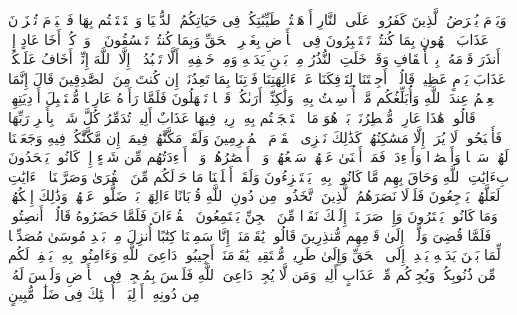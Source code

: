 \startbuffer[\q:46:20]
وَیَوۡمَ یُعۡرَضُ ٱلَّذِینَ كَفَرُوا۟ عَلَى ٱلنَّارِ أَذۡهَبۡتُمۡ طَیِّبَٰتِكُمۡ فِی حَیَاتِكُمُ ٱلدُّنۡیَا وَٱسۡتَمۡتَعۡتُم بِهَا فَٱلۡیَوۡمَ تُجۡزَوۡنَ عَذَابَ ٱلۡهُونِ بِمَا كُنتُمۡ تَسۡتَكۡبِرُونَ فِی ٱلۡأَرۡضِ بِغَیۡرِ ٱلۡحَقِّ وَبِمَا كُنتُمۡ تَفۡسُقُونَ%
\stopbuffer%
\startbuffer[\q:46:21]
۞ وَٱذۡكُرۡ أَخَا عَادٍ إِذۡ أَنذَرَ قَوۡمَهُۥ بِٱلۡأَحۡقَافِ وَقَدۡ خَلَتِ ٱلنُّذُرُ مِنۢ بَیۡنِ یَدَیۡهِ وَمِنۡ خَلۡفِهِۦۤ أَلَّا تَعۡبُدُوۤا۟ إِلَّا ٱللَّهَ إِنِّیۤ أَخَافُ عَلَیۡكُمۡ عَذَابَ یَوۡمٍ عَظِیمࣲ%
\stopbuffer%
\startbuffer[\q:46:22]
قَالُوۤا۟ أَجِئۡتَنَا لِتَأۡفِكَنَا عَنۡ ءَالِهَتِنَا فَأۡتِنَا بِمَا تَعِدُنَاۤ إِن كُنتَ مِنَ ٱلصَّٰدِقِینَ%
\stopbuffer%
\startbuffer[\q:46:23]
قَالَ إِنَّمَا ٱلۡعِلۡمُ عِندَ ٱللَّهِ وَأُبَلِّغُكُم مَّاۤ أُرۡسِلۡتُ بِهِۦ وَلَٰكِنِّیۤ أَرَىٰكُمۡ قَوۡمࣰا تَجۡهَلُونَ%
\stopbuffer%
\startbuffer[\q:46:24]
فَلَمَّا رَأَوۡهُ عَارِضࣰا مُّسۡتَقۡبِلَ أَوۡدِیَتِهِمۡ قَالُوا۟ هَٰذَا عَارِضࣱ مُّمۡطِرُنَاۚ بَلۡ هُوَ مَا ٱسۡتَعۡجَلۡتُم بِهِۦۖ رِیحࣱ فِیهَا عَذَابٌ أَلِیمࣱ%
\stopbuffer%
\startbuffer[\q:46:25]
تُدَمِّرُ كُلَّ شَیۡءِۭ بِأَمۡرِ رَبِّهَا فَأَصۡبَحُوا۟ لَا یُرَىٰۤ إِلَّا مَسَٰكِنُهُمۡۚ كَذَٰلِكَ نَجۡزِی ٱلۡقَوۡمَ ٱلۡمُجۡرِمِینَ%
\stopbuffer%
\startbuffer[\q:46:26]
وَلَقَدۡ مَكَّنَّٰهُمۡ فِیمَاۤ إِن مَّكَّنَّٰكُمۡ فِیهِ وَجَعَلۡنَا لَهُمۡ سَمۡعࣰا وَأَبۡصَٰرࣰا وَأَفۡءِدَةࣰ فَمَاۤ أَغۡنَىٰ عَنۡهُمۡ سَمۡعُهُمۡ وَلَاۤ أَبۡصَٰرُهُمۡ وَلَاۤ أَفۡءِدَتُهُم مِّن شَیۡءٍ إِذۡ كَانُوا۟ یَجۡحَدُونَ بِءَایَٰتِ ٱللَّهِ وَحَاقَ بِهِم مَّا كَانُوا۟ بِهِۦ یَسۡتَهۡزِءُونَ%
\stopbuffer%
\startbuffer[\q:46:27]
وَلَقَدۡ أَهۡلَكۡنَا مَا حَوۡلَكُم مِّنَ ٱلۡقُرَىٰ وَصَرَّفۡنَا ٱلۡءَایَٰتِ لَعَلَّهُمۡ یَرۡجِعُونَ%
\stopbuffer%
\startbuffer[\q:46:28]
فَلَوۡلَا نَصَرَهُمُ ٱلَّذِینَ ٱتَّخَذُوا۟ مِن دُونِ ٱللَّهِ قُرۡبَانًا ءَالِهَةَۢۖ بَلۡ ضَلُّوا۟ عَنۡهُمۡۚ وَذَٰلِكَ إِفۡكُهُمۡ وَمَا كَانُوا۟ یَفۡتَرُونَ%
\stopbuffer%
\startbuffer[\q:46:29]
وَإِذۡ صَرَفۡنَاۤ إِلَیۡكَ نَفَرࣰا مِّنَ ٱلۡجِنِّ یَسۡتَمِعُونَ ٱلۡقُرۡءَانَ فَلَمَّا حَضَرُوهُ قَالُوۤا۟ أَنصِتُوا۟ۖ فَلَمَّا قُضِیَ وَلَّوۡا۟ إِلَىٰ قَوۡمِهِم مُّنذِرِینَ%
\stopbuffer%
\startbuffer[\q:46:30]
قَالُوا۟ یَٰقَوۡمَنَاۤ إِنَّا سَمِعۡنَا كِتَٰبًا أُنزِلَ مِنۢ بَعۡدِ مُوسَىٰ مُصَدِّقࣰا لِّمَا بَیۡنَ یَدَیۡهِ یَهۡدِیۤ إِلَى ٱلۡحَقِّ وَإِلَىٰ طَرِیقࣲ مُّسۡتَقِیمࣲ%
\stopbuffer%
\startbuffer[\q:46:31]
یَٰقَوۡمَنَاۤ أَجِیبُوا۟ دَاعِیَ ٱللَّهِ وَءَامِنُوا۟ بِهِۦ یَغۡفِرۡ لَكُم مِّن ذُنُوبِكُمۡ وَیُجِرۡكُم مِّنۡ عَذَابٍ أَلِیمࣲ%
\stopbuffer%
\startbuffer[\q:46:32]
وَمَن لَّا یُجِبۡ دَاعِیَ ٱللَّهِ فَلَیۡسَ بِمُعۡجِزࣲ فِی ٱلۡأَرۡضِ وَلَیۡسَ لَهُۥ مِن دُونِهِۦۤ أَوۡلِیَاۤءُۚ أُو۟لَٰۤئِكَ فِی ضَلَٰلࣲ مُّبِینٍ%
